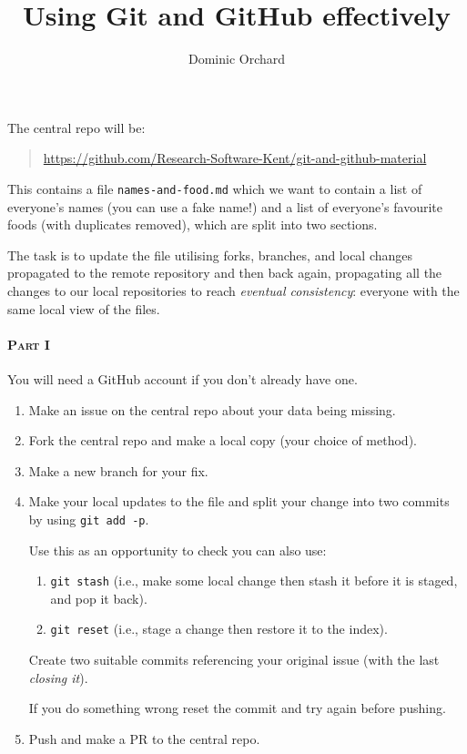 \documentclass[a4paper]{article}
\title{Using Git and GitHub effectively}
\author{Dominic Orchard}
\begin{document}
\maketitle

The central repo will be:

\begin{quote}
\url{https://github.com/Research-Software-Kent/git-and-github-material}
\end{quote}

This contains a file \texttt{names-and-food.md} which we want to contain a list of everyone's names (you can use a fake name!) and a list of everyone's favourite foods (with duplicates removed), which are split into two sections.

The task is to update the file utilising forks, branches, and local changes propagated to the remote repository and then back again, propagating all the changes to our local repositories to reach \emph{eventual consistency}: everyone with the same local view of the files.

\paragraph{ \textsc{Part I}} You will need a GitHub account if you don't
already have one.

\begin{enumerate}
\item Make an issue on the central repo about your data being missing.
\item Fork the central repo and make a local copy (your choice of method).
\item Make a new branch for your fix.
\item Make your local updates to the file and split your change into two commits by using \texttt{git add -p}.

Use this as an opportunity to check you can also use:

\begin{enumerate}
\item \texttt{git stash} (i.e., make some local change then stash it
before it is staged, and pop it back).
\item \texttt{git reset} (i.e., stage a change then restore it to the index).
\end{enumerate}

Create two suitable commits referencing your original issue (with
the last \emph{closing it}).

If you do something wrong reset the commit and try again before pushing.

\item Push and make a PR to the central repo.
\end{enumerate}
\end{document}
